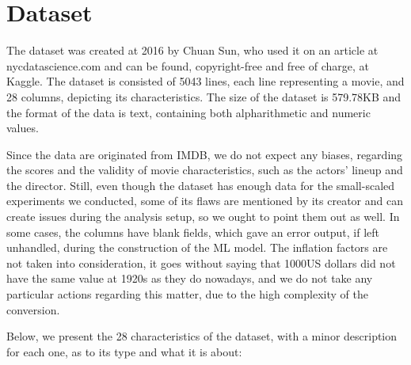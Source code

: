 \documentclass[letterpaper,twocolumn,10pt]{article}
\begin{document}
\section{Dataset}
\par The dataset was created at 2016 by Chuan Sun, who used it on an article at nycdatascience.com\cite{nyc} and can be found, copyright-free and free of charge, at Kaggle\cite{kaggle}. The dataset is consisted of 5043 lines, each line representing a movie, and 28 columns, depicting its characteristics. The size of the dataset is 579.78KB and the format of the data is text, containing both alpharithmetic and numeric values.\par Since the data are originated from IMDB, we do not expect any biases, regarding the scores and the validity of movie characteristics, such as the actors' lineup and the director. Still, even though the dataset has enough data for the small-scaled experiments we conducted, some of its flaws are mentioned by its creator and can create issues during the analysis setup, so we ought to point them out as well. In some cases, the columns have blank fields, which gave an error output, if left unhandled, during the construction of the ML model. The inflation factors are not taken into consideration, it goes without saying that 1000US dollars did not have the same value at 1920s as they do nowadays, and we do not take any particular actions regarding this matter, due to the high complexity of the conversion. \par Below, we present the 28 characteristics of the dataset, with a minor description for each one, as to its type and what it is about:
\end{document}
